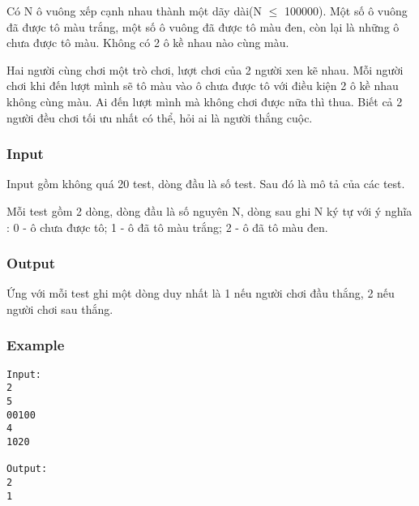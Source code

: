 



   Có N ô vuông xếp cạnh nhau thành một dãy dài(N $\le$ 100000). Một số ô vuông đã được tô màu trắng, một số ô vuông đã được tô màu đen, còn lại là những ô chưa được tô màu. Không có 2 ô kề nhau nào cùng màu.   


   Hai người cùng chơi một trò chơi, lượt chơi của 2 người xen kẽ nhau. Mỗi người chơi khi đến lượt mình sẽ tô màu vào ô chưa được tô với điều kiện 2 ô kề nhau không cùng màu. Ai đến lượt mình mà không chơi được nữa thì thua. Biết cả 2 người đều chơi tối ưu nhất có thể, hỏi ai là người thắng cuộc.  

\subsubsection{   Input  }

   Input gồm không quá 20 test, dòng đầu là số test. Sau đó là mô tả của các test.   


   Mỗi test gồm 2 dòng, dòng đầu là số nguyên N, dòng sau ghi N ký tự với ý nghĩa : 0 - ô chưa được tô; 1 - ô đã tô màu trắng; 2 - ô đã tô màu đen.  

\subsubsection{   Output  }

   Ứng với mỗi test ghi một dòng duy nhất là 1 nếu người chơi đầu thắng, 2 nếu người chơi sau thắng.  

\subsubsection{   Example  }
\begin{verbatim}
Input:
2
5
00100
4
1020

Output:
2
1
\end{verbatim}
